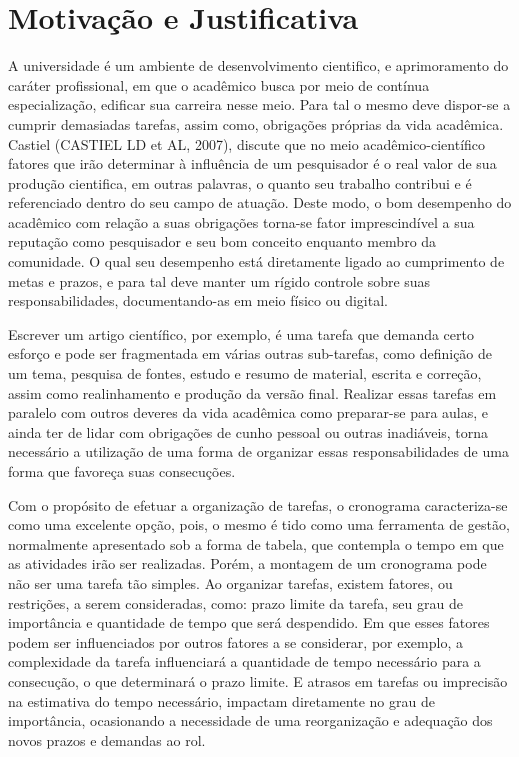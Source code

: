 \section[Motivação e Justificativa]{Motivação e Justificativa}
\par A universidade é um ambiente de desenvolvimento cientifico, e aprimoramento do caráter profissional, em que o acadêmico busca por meio de contínua especialização, edificar sua carreira nesse meio. Para tal o mesmo deve dispor-se a cumprir demasiadas tarefas, assim como, obrigações próprias da vida acadêmica. Castiel (CASTIEL LD et AL, 2007), discute que no meio acadêmico-científico fatores que irão determinar à influência de um pesquisador é o real valor de sua produção cientifica, em outras palavras, o quanto seu trabalho contribui e é referenciado dentro do seu campo de atuação. Deste modo, o bom desempenho do acadêmico com relação a suas obrigações torna-se fator imprescindível a sua reputação como pesquisador e seu bom conceito enquanto membro da comunidade. O qual seu desempenho está diretamente ligado ao cumprimento de metas e prazos, e para tal deve manter um rígido controle sobre suas responsabilidades, documentando-as em meio físico ou digital.
\par Escrever um artigo científico, por exemplo, é uma tarefa que demanda certo esforço e pode ser fragmentada em várias outras sub-tarefas, como definição de um tema, pesquisa de fontes, estudo e resumo de material, escrita e correção, assim como realinhamento e produção da versão final. Realizar essas tarefas em paralelo com outros deveres da vida acadêmica como preparar-se para aulas, e ainda ter de lidar com obrigações de cunho pessoal ou outras inadiáveis, torna necessário a utilização de uma forma de organizar essas responsabilidades de uma forma que favoreça suas consecuções.
\par Com o propósito de efetuar a organização de tarefas, o cronograma caracteriza-se como uma excelente opção, pois, o mesmo é tido como uma ferramenta de gestão, normalmente apresentado sob a forma de tabela, que contempla o tempo em que as atividades irão ser realizadas. Porém, a montagem de um cronograma pode não ser uma tarefa tão simples. Ao organizar tarefas, existem fatores, ou restrições, a serem consideradas, como: prazo limite da tarefa, seu grau de importância e quantidade de tempo que será despendido. Em que esses fatores podem ser influenciados por outros fatores a se considerar, por exemplo, a complexidade da tarefa influenciará a quantidade de tempo necessário para a consecução, o que determinará o prazo limite. E atrasos em tarefas ou imprecisão na estimativa do tempo necessário, impactam diretamente no grau de importância, ocasionando a necessidade de uma reorganização e adequação dos novos prazos e demandas ao rol.

